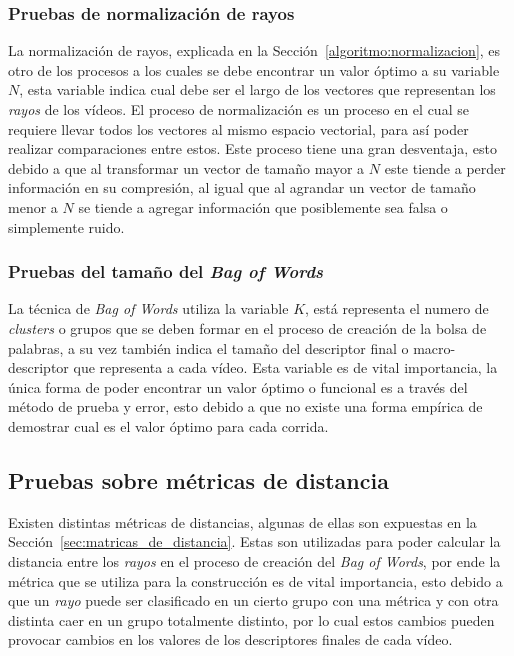 	\subsubsection{Pruebas de normalización de rayos}	
	La normalización de rayos, explicada en la Sección~\ref{algoritmo:normalizacion}, es otro de los procesos a los cuales se debe encontrar un valor óptimo a su variable $N$, esta variable indica cual debe ser el largo de los vectores que representan los \textit{rayos} de los vídeos. El proceso de normalización es un proceso en el cual se requiere llevar todos los vectores al mismo espacio vectorial, para así poder realizar comparaciones entre estos. Este proceso tiene una gran desventaja, esto debido a que al transformar un vector de tamaño mayor a $N$ este tiende a perder información en su compresión, al igual que al agrandar un vector de tamaño menor a $N$ se tiende a agregar información que posiblemente sea falsa o simplemente ruido.

	\subsubsection{Pruebas del tamaño del \textit{Bag of Words}}
	La técnica de \textit{Bag of Words} utiliza la variable $K$, está representa el numero de \textit{clusters} o grupos que se deben formar en el proceso de creación de la bolsa de palabras, a su vez también indica el tamaño del descriptor final o macro-descriptor que representa a cada vídeo. Esta variable es de vital importancia, la única forma de poder encontrar un valor óptimo o funcional es a través del método de prueba y error, esto debido a que no existe una forma empírica de demostrar cual es el valor óptimo para cada corrida.


\subsection{Pruebas sobre métricas de distancia}
\label{exp:metricas}
Existen distintas métricas de distancias, algunas de ellas son expuestas en la Sección~\ref{sec:matricas_de_distancia}. Estas son utilizadas para poder calcular la distancia entre los \textit{rayos} en el proceso de creación del \textit{Bag of Words}, por ende la métrica que se utiliza para la construcción es de vital importancia, esto debido a que un \textit{rayo} puede ser clasificado en un cierto grupo con una métrica y con otra distinta caer en un grupo totalmente distinto, por lo cual estos cambios pueden provocar cambios en los valores de los descriptores finales de cada vídeo.
